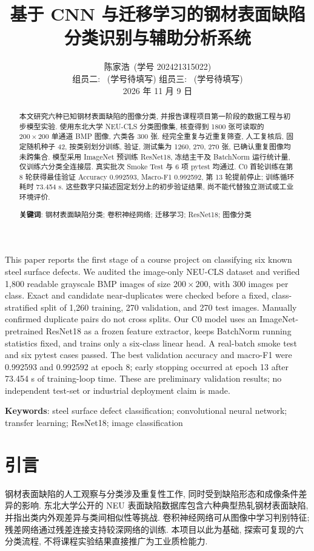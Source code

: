 \documentclass[letterpaper, 10 pt, conference]{ieeeconf}
\title{\LARGE \bf
基于 CNN 与迁移学习的钢材表面缺陷分类识别与辅助分析系统
}
\author{陈家浩~(学号 202421315022) \\
组员二: \underline{\hspace{1.8cm}}~(学号待填写) \quad
组员三: \underline{\hspace{1.8cm}}~(学号待填写) \\
2026 年 11 月 9 日}
\begin{document}
\maketitle

\begin{abstract}
本文研究六种已知钢材表面缺陷的图像分类, 并报告课程项目第一阶段的数据工程与初步模型实验. 使用东北大学 NEU-CLS 分类图像集, 核查得到 1800 张可读取的 $200\times200$ 单通道 BMP 图像, 六类各 300 张. 经完全重复与近重复筛查, 人工复核后, 固定随机种子 42, 按类别划分训练, 验证, 测试集为 1260, 270, 270 张, 已确认重复图像均未跨集合. 模型采用 ImageNet 预训练 ResNet18, 冻结主干及 BatchNorm 运行统计量, 仅训练六分类全连接层. 真实批次 Smoke Test 与 6 项 pytest 均通过. C0 首轮训练在第 8 轮获得最佳验证 Accuracy 0.992593, Macro-F1 0.992592, 第 13 轮提前停止; 训练循环耗时 73.454 s. 这些数字只描述固定划分上的初步验证结果, 尚不能代替独立测试或工业环境评价.

\vspace{1ex}\noindent\textbf{关键词}: 钢材表面缺陷分类; 卷积神经网络; 迁移学习; ResNet18; 图像分类
\end{abstract}

\begin{eabstract}
This paper reports the first stage of a course project on classifying six known steel surface defects. We audited the image-only NEU-CLS dataset and verified 1,800 readable grayscale BMP images of size $200\times200$, with 300 images per class. Exact and candidate near-duplicates were checked before a fixed, class-stratified split of 1,260 training, 270 validation, and 270 test images. Manually confirmed duplicate pairs do not cross splits. Our C0 model uses an ImageNet-pretrained ResNet18 as a frozen feature extractor, keeps BatchNorm running statistics fixed, and trains only a six-class linear head. A real-batch smoke test and six pytest cases passed. The best validation accuracy and macro-F1 were 0.992593 and 0.992592 at epoch 8; early stopping occurred at epoch 13 after 73.454 s of training-loop time. These are preliminary validation results; no independent test-set or industrial deployment claim is made.

\vspace{1ex}\noindent\textbf{Keywords}: steel surface defect classification; convolutional neural network; transfer learning; ResNet18; image classification
\end{eabstract}

\section{引言}
钢材表面缺陷的人工观察与分类涉及重复性工作, 同时受到缺陷形态和成像条件差异的影响. 东北大学公开的 NEU 表面缺陷数据库包含六种典型热轧钢材表面缺陷, 并指出类内外观差异与类间相似性等挑战\cite{neu-database}. 卷积神经网络可从图像中学习判别特征; 残差网络通过残差连接支持较深网络的训练\cite{resnet}. 本项目以此为基础, 探索可复现的六分类流程, 不将课程实验结果直接推广为工业质检能力.
\end{document}
